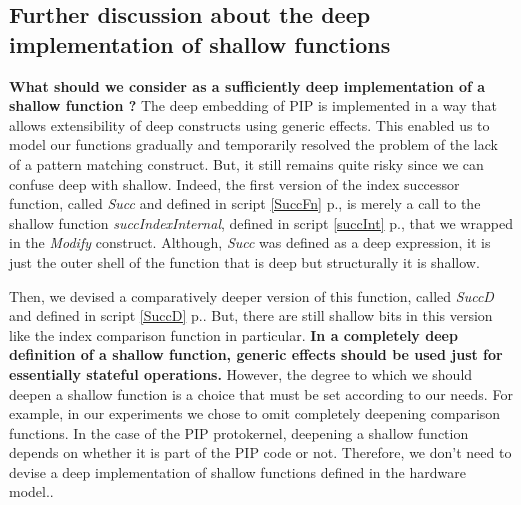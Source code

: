 \subsection{Further discussion about the deep implementation of shallow functions}
\textbf{What should we consider as a sufficiently deep implementation of a shallow function ?} The deep embedding of PIP is implemented in a way that allows extensibility of deep constructs using generic effects. This enabled us to model our functions gradually and temporarily resolved the problem of the lack of a pattern matching construct. But, it still remains quite risky since we can confuse deep with shallow. Indeed, the first version of the index successor function, called \textit{Succ} and defined in script \ref{SuccFn} p.\pageref{SuccFn}, is merely a call to the shallow function \textit{succIndexInternal}, defined in script \ref{succInt} p.\pageref{succInt}, that we wrapped in the \textit{Modify} construct. Although, \textit{Succ} was  defined as a deep expression, it is just the outer shell of the function that is deep but structurally it is shallow. \pagebreak

Then, we devised a comparatively deeper version of this function, called \textit{SuccD} and defined in script \ref{SuccD} p.\pageref{SuccD}. But, there are still shallow bits in this version like the index comparison function in particular. \textbf{In a completely deep definition of a shallow function, generic effects should be used just for essentially stateful operations.} However, the degree  to which we should deepen a shallow function is a choice that must be set according to our needs. For example, in our experiments we chose to omit completely deepening comparison functions. In the case of the PIP protokernel, deepening a shallow function depends on whether it is part of the PIP code or not. Therefore, we don't need to devise a deep implementation of shallow functions defined in the hardware model..